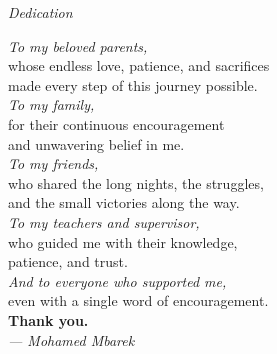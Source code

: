 
\clearpage
\thispagestyle{empty}

\vspace*{\fill}

\begin{center}
    {\Huge\itshape\color{deepblue} Dedication}
\end{center}

\vspace{1.5cm}

\begin{flushright}
\begin{minipage}{0.7\textwidth}
\itshape
{}
\begin{flushright}

\textit{To my beloved parents,}\\
whose endless love, patience, and sacrifices\\
made every step of this journey possible.\\[14pt]

\textit{To my family,}\\
for their continuous encouragement\\
and unwavering belief in me.\\[14pt]

\textit{To my friends,}\\
who shared the long nights, the struggles,\\
and the small victories along the way.\\[14pt]

\textit{To my teachers and supervisor,}\\
who guided me with their knowledge,\\
patience, and trust.\\[14pt]

\textit{And to everyone who supported me,}\\
even with a single word of encouragement.\\[24pt]

\textbf{Thank you.}\\[6pt]
\textit{— Mohamed Mbarek}

\end{flushright}
\end{minipage}
\end{flushright}

\vspace*{\fill}

\addtocounter{page}{-1}
